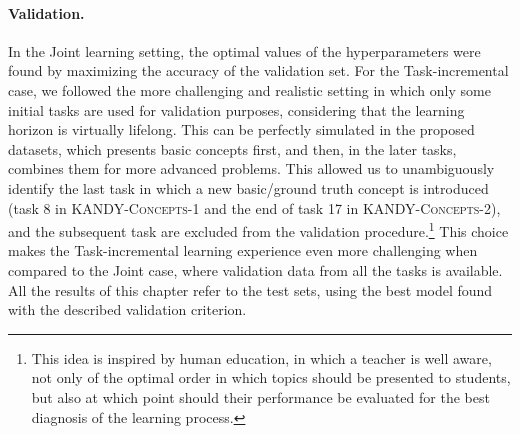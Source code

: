 \paragraph{Validation.} In the Joint learning setting, the optimal values of the hyperparameters were found by maximizing the accuracy of the validation set. For the Task-incremental case, we followed the more challenging and realistic setting in which only some initial tasks are used for validation purposes, considering that the learning horizon is virtually lifelong. This can be perfectly simulated in  the proposed datasets, %
which presents basic concepts first, and then, in the later tasks, combines them for more advanced problems. This allowed us to %
unambiguously identify the last task in which a new basic/ground truth concept is introduced (task 8 in \textsc{KANDY-Concepts-1} and the end of task 17  in \textsc{KANDY-Concepts-2}), and the subsequent task are excluded from the validation procedure.\footnote{This idea is inspired by human education, in which a teacher is well aware, not only of the optimal order in which topics should be presented to students, but also at which point should their performance be evaluated for the best diagnosis of the learning process.} This choice makes the Task-incremental learning experience even more challenging when compared to the Joint case, where validation data from all the tasks is available. All the results of this chapter refer to the test sets, using the best model found with the described validation criterion.




